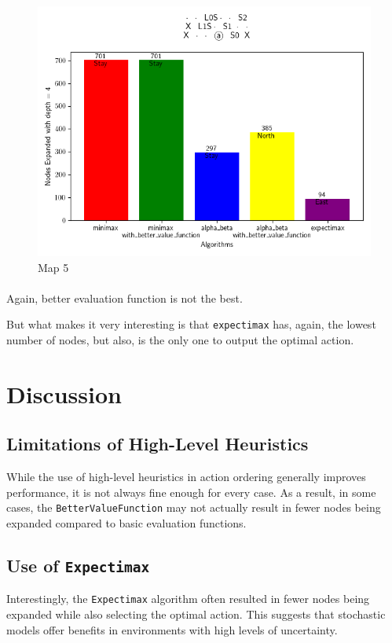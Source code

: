 \documentclass{article}
\begin{document}
\begin{figure}[h]
    \centering
    \includegraphics[width=\textwidth]{media/map2023_10_29_13_55_47.png}
    \caption{Map 5}
    \label{fig:image5}
\end{figure}
\vspace{1em}

\paragraph{}
Again, better evaluation function is not the best.

But what makes it very interesting is that \texttt{expectimax} has,
 again, the lowest number of nodes, 
 but also, is the only one to output the optimal action.

\newpage
\section{Discussion}
\subsection{Limitations of High-Level Heuristics}
While the use of high-level heuristics in action ordering 
generally improves performance, 
it is not always fine enough for every case.
As a result, in some cases, the \texttt{BetterValueFunction} 
may not actually result in fewer nodes being expanded 
compared to basic evaluation functions.

\subsection{Use of \texttt{Expectimax}}
Interestingly, the \texttt{Expectimax} algorithm often 
resulted in fewer nodes being expanded 
while also selecting the optimal action. 
This suggests that stochastic models offer benefits in environments 
with high levels of uncertainty.
\end{document}

